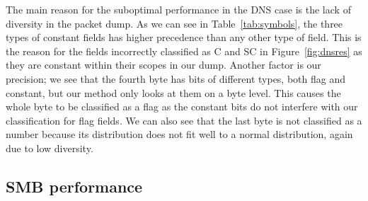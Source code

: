 \documentclass[a4paper]{report}
\begin{document}
The main reason for the suboptimal performance in the DNS case is the lack of
diversity in the packet dump. As we can see in Table~\ref{tab:symbols}, the
three types of constant fields has higher precedence than any other type of
field. This is the reason for the fields incorrectly classified as C and SC in
Figure~\ref{fig:dnsres} as they are constant within their scopes in our dump.
Another factor is our precision; we see that the fourth byte has bits of
different types, both flag and constant, but our method only looks at them on
a byte level. This causes the whole byte to be classified as a flag as the
constant bits do not interfere with our classification for flag fields. We can
also see that the last byte is not classified as a number because its
distribution does not fit well to a normal distribution, again due to low
diversity.

\subsection{SMB performance}

\end{document}
